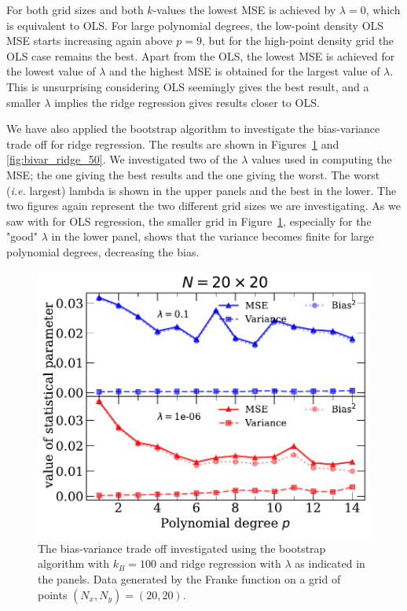 \documentclass[a4paper, 
amsfonts, 
amssymb, 
amsmath, 
reprint, 
showkeys, 
nofootinbib, 
twoside]{revtex4-2}
\begin{document}
For both grid sizes and both $k$-values the lowest MSE is achieved by $\lambda = 0$, which is equivalent to OLS. For large polynomial degrees, the low-point density OLS MSE starts increasing again above $p = 9$, but for the high-point density grid the OLS case remains the best. Apart from the OLS, the lowest MSE is achieved for the lowest value of $\lambda$ and the highest MSE is obtained for the largest value of $\lambda$. This is unsurprising considering OLS seemingly gives the best result, and a smaller $\lambda$ implies the ridge regression gives results closer to OLS. 

We have also applied the bootstrap algorithm to investigate the bias-variance trade off for ridge regression. The results are shown in Figures~\ref{fig:bivar_rdige_20} and \ref{fig:bivar_ridge_50}. We investigated two of the $\lambda$ values used in computing the MSE; the one giving the best results and the one giving the worst. The worst (\textit{i.e.} largest) lambda is shown in the upper panels and the best in the lower. The two figures again represent the two different grid sizes we are investigating. As we saw with for OLS regression, the smaller grid in Figure~\ref{fig:bivar_rdige_20}, especially for the "good" $\lambda$ in the lower panel, shows that the variance becomes finite for large polynomial degrees, decreasing the bias. 

\begin{figure}
    \centering
    \includegraphics[width = \columnwidth]{Figures/biasvar_ridge_n20.pdf}
    \caption{The bias-variance trade off investigated using the bootstrap algorithm with $k_B = 100$ and ridge regression with $\lambda$ as indicated in the panels. Data generated by the Franke function on a grid of points $(N_x, N_y) = (20,20)$.}
    \label{fig:bivar_rdige_20}
\end{figure}
\end{document}
